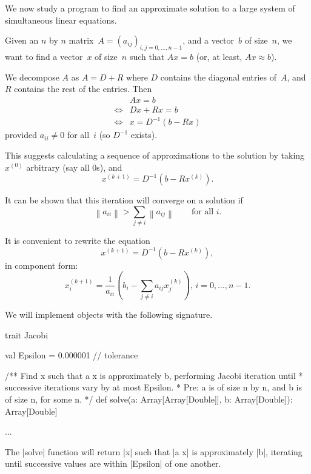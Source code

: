 
\begin{slide}

We now study a program to find an approximate solution to a large system of
simultaneous linear equations.

Given an $n$ by $n$ matrix~$A = (a_{ij})_{i,j = 0, \ldots, n-1}$, and a
vector~$b$ of size~$n$, we want to find a vector~$x$ of size~$n$ such that
$Ax = b$ (or, at least, $Ax \approx b$).
\end{slide}


\begin{slide}

We decompose $A$ as $A = D+R$ where $D$ contains the diagonal entries of~$A$,
and $R$ contains the rest of the entries.  Then
\[
\begin{array}{cl}
& Ax = b \\
\iff & Dx + Rx = b \\
\iff & x = D^{-1} (b - Rx)
\end{array}
\]
%
provided $a_{ii} \ne 0$ for all~$i$ (so $ D^{-1}$ exists). 

This suggests calculating a sequence of approximations to the solution by
taking $x^{(0)}$ arbitrary (say all $0$s), and
\[
x^{(k+1)} = D^{ - 1} \left( b-R x^{(k)} \right).
\]
   
It can be shown that this iteration will converge on a solution if
\[
 \left \| a_{ii} \right \| > \sum_{j \ne i} \left \| a_{ij} \right \| 
  \qquad \mbox{for all $i$}. 
\]
\end{slide}


\begin{slide}

It is convenient to rewrite the equation 
\[
x^{(k+1)} = D^{ - 1} \left( b-R x^{(k)} \right),
\]
in component form:
\[
x^{(k+1)}_i = \frac{1}{a_{ii}} \left(b_i -\sum_{j\ne i}a_{ij}x^{(k)}_j\right),\,
   i=0,\ldots,n-1. 
\]
\end{slide}


\begin{slide}

We will implement objects with the following signature.

\begin{scala}
trait Jacobi{
  val Epsilon = 0.000001 // tolerance

  /** Find x such that a x is approximately b, performing Jacobi iteration until
    * successive iterations vary by at most Epsilon.
    * Pre: a is of size n by n, and b is of size n, for some n. */
  def solve(a: Array[Array[Double]], b: Array[Double]): Array[Double]

  ...
}
\end{scala}

The |solve| function will return |x| such that |a x| is approximately |b|,
iterating until successive values are within |Epsilon| of one another. 
\end{slide}

